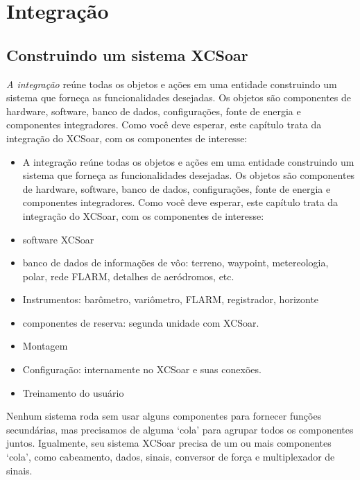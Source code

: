 \chapter{Integração}\label{cha:Integration}

\section{Construindo um sistema XCSoar }
\emph{A integração} reúne todas os objetos e ações em uma entidade construindo um sistema que forneça as funcionalidades desejadas.  Os objetos são componentes de hardware, software, banco de dados, configurações, fonte de energia e componentes integradores.  Como você deve esperar, este capítulo trata da integração do XCSoar, com os componentes de interesse:
\begin{itemize} 
\item A integração reúne todas os objetos e ações em uma entidade construindo um sistema que forneça as funcionalidades desejadas.  Os objetos são componentes de hardware, software, banco de dados, configurações, fonte de energia e componentes integradores.  Como você deve esperar, este capítulo trata da integração do XCSoar, com os componentes de interesse:
\item software XCSoar  
\item banco de dados de informações de vôo: terreno, waypoint, metereologia, polar, rede FLARM, detalhes de aeródromos, etc.
\item Instrumentos: barômetro, variômetro, FLARM, registrador, horizonte
\item componentes de reserva: segunda unidade com XCSoar.
\item Montagem
\item Configuração: internamente no XCSoar e suas conexões.
\item Treinamento do usuário
\end{itemize}
Nenhum sistema roda sem usar alguns componentes para fornecer funções secundárias, mas precisamos de alguma ‘cola’ para agrupar todos os componentes juntos.  Igualmente, seu sistema XCSoar precisa de um ou mais componentes ‘cola’, como cabeamento, dados, sinais, conversor de força e multiplexador de sinais.

